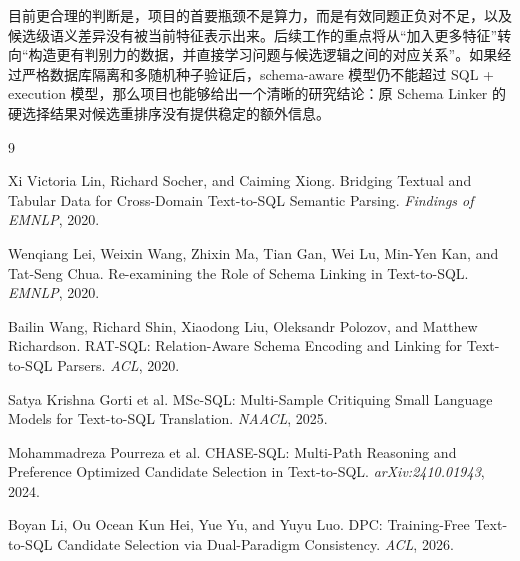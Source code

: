 \documentclass[UTF8,11pt,fontset=windows]{ctexart}
\begin{document}
目前更合理的判断是，项目的首要瓶颈不是算力，而是有效同题正负对不足，以及候选级语义差异没有被当前特征表示出来。后续工作的重点将从“加入更多特征”转向“构造更有判别力的数据，并直接学习问题与候选逻辑之间的对应关系”。如果经过严格数据库隔离和多随机种子验证后，schema-aware 模型仍不能超过 SQL + execution 模型，那么项目也能够给出一个清晰的研究结论：原 Schema Linker 的硬选择结果对候选重排序没有提供稳定的额外信息。

\begin{thebibliography}{9}
\small

Xi Victoria Lin, Richard Socher, and Caiming Xiong.
\newblock Bridging Textual and Tabular Data for Cross-Domain Text-to-SQL Semantic Parsing.
\newblock \emph{Findings of EMNLP}, 2020.

Wenqiang Lei, Weixin Wang, Zhixin Ma, Tian Gan, Wei Lu, Min-Yen Kan, and Tat-Seng Chua.
\newblock Re-examining the Role of Schema Linking in Text-to-SQL.
\newblock \emph{EMNLP}, 2020.

Bailin Wang, Richard Shin, Xiaodong Liu, Oleksandr Polozov, and Matthew Richardson.
\newblock RAT-SQL: Relation-Aware Schema Encoding and Linking for Text-to-SQL Parsers.
\newblock \emph{ACL}, 2020.

Satya Krishna Gorti et al.
\newblock MSc-SQL: Multi-Sample Critiquing Small Language Models for Text-to-SQL Translation.
\newblock \emph{NAACL}, 2025.

Mohammadreza Pourreza et al.
\newblock CHASE-SQL: Multi-Path Reasoning and Preference Optimized Candidate Selection in Text-to-SQL.
\newblock \emph{arXiv:2410.01943}, 2024.

Boyan Li, Ou Ocean Kun Hei, Yue Yu, and Yuyu Luo.
\newblock DPC: Training-Free Text-to-SQL Candidate Selection via Dual-Paradigm Consistency.
\newblock \emph{ACL}, 2026.

\end{thebibliography}
\end{document}
